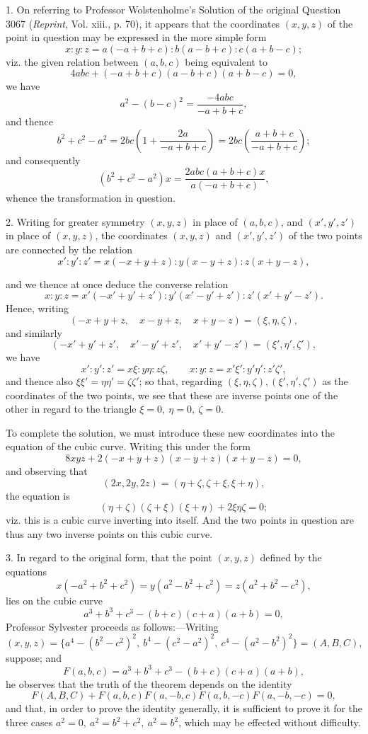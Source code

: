 \documentclass[10pt,twoside]{article}
\begin{document}
1. On referring to Professor Wolstenholme's Solution of the original Question
3067 (\textit{Reprint}, Vol. xiii., p. 70), it appears that the coordinates
\((x,y,z)\) of the point in question may be expressed in the more simple form
\[
x:y:z=a(-a+b+c):b(a-b+c):c(a+b-c);
\]
viz. the given relation between \((a,b,c)\) being equivalent to
\[
        4abc+(-a+b+c)(a-b+c)(a+b-c)=0,
\]
we have
\[
        a^2-(b-c)^2=\frac{-4abc}{-a+b+c},
\]
and thence
\[
b^2+c^2-a^2=2bc\left(1+\frac{2a}{-a+b+c}\right)
       =2bc\left(\frac{a+b+c}{-a+b+c}\right);
\]
and consequently
\[
(b^2+c^2-a^2)x=\frac{2abc(a+b+c)x}{a(-a+b+c)},
\]
whence the transformation in question.

2. Writing for greater symmetry \((x,y,z)\) in place of \((a,b,c)\), and
\((x',y',z')\) in place of \((x,y,z)\), the coordinates \((x,y,z)\) and
\((x',y',z')\) of the two points are connected by the relation
\[
x':y':z'=x(-x+y+z):y(x-y+z):z(x+y-z),
\]

\newpage

and we thence at once deduce the converse relation
\[
x:y:z=x'(-x'+y'+z'):y'(x'-y'+z'):z'(x'+y'-z').
\]
Hence, writing
\[
(-x+y+z,\quad x-y+z,\quad x+y-z)=(\xi,\eta,\zeta),
\]
and similarly
\[
(-x'+y'+z',\quad x'-y'+z',\quad x'+y'-z')=(\xi',\eta',\zeta'),
\]
we have
\[
x':y':z'=x\xi:y\eta:z\zeta,\qquad
x:y:z=x'\xi':y'\eta':z'\zeta',
\]
and thence also \(\xi\xi'=\eta\eta'=\zeta\zeta'\); so that, regarding
\((\xi,\eta,\zeta),(\xi',\eta',\zeta')\) as the coordinates of the two points,
we see that these are inverse points one of the other in regard to the triangle
\(\xi=0,\ \eta=0,\ \zeta=0\).

To complete the solution, we must introduce these new coordinates into the
equation of the cubic curve. Writing this under the form
\[
        8xyz+2(-x+y+z)(x-y+z)(x+y-z)=0,
\]
and observing that
\[
        (2x,2y,2z)=(\eta+\zeta,\zeta+\xi,\xi+\eta),
\]
the equation is
\[
        (\eta+\zeta)(\zeta+\xi)(\xi+\eta)+2\xi\eta\zeta=0;
\]
viz. this is a cubic curve inverting into itself. And the two points in
question are thus any two inverse points on this cubic curve.

3. In regard to the original form, that the point \((x,y,z)\) defined by the
equations
\[
        x(-a^2+b^2+c^2)=y(a^2-b^2+c^2)=z(a^2+b^2-c^2),
\]
lies on the cubic curve
\[
        a^3+b^3+c^3-(b+c)(c+a)(a+b)=0,
\]
Professor Sylvester proceeds as follows:---Writing
\[
(x,y,z)=\{a^4-(b^2-c^2)^2,\ b^4-(c^2-a^2)^2,\ c^4-(a^2-b^2)^2\}=(A,B,C),
\]
suppose; and
\[
        F(a,b,c)=a^3+b^3+c^3-(b+c)(c+a)(a+b),
\]
he observes that the truth of the theorem depends on the identity
\[
F(A,B,C)+F(a,b,c)F(a,-b,c)F(a,b,-c)F(a,-b,-c)=0,
\]
and that, in order to prove the identity generally, it is sufficient to prove
it for the three cases \(a^2=0,\ a^2=b^2+c^2,\ a^2=b^2\), which may be effected
without difficulty.
\end{document}

